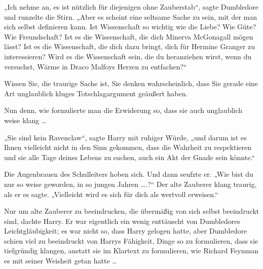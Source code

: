„Ich nehme an, es ist nützlich für diejenigen ohne Zauberstab“, sagte Dumbledore und runzelte die Stirn.
„Aber es scheint eine seltsame Sache zu sein, mit der man sich selbst definieren kann. Ist Wissenschaft so wichtig wie die Liebe? Wie Güte? Wie Freundschaft? Ist es die Wissenschaft, die dich Minerva McGonagall mögen lässt? Ist es die Wissenschaft, die dich dazu bringt, dich für Hermine Granger zu interessieren? Wird es die Wissenschaft sein, die du heranziehen wirst, wenn du versuchst, Wärme in Draco Malfoys Herzen zu entfachen?“

Wissen Sie, die traurige Sache ist, Sie denken wahrscheinlich, dass Sie gerade eine Art unglaublich kluges Totschlagargument geäußert haben.

Nun denn, wie formulierte man die Erwiderung so, dass sie auch unglaublich weise klang …

„Sie sind kein Ravenclaw“, sagte Harry mit ruhiger Würde, „und darum ist es Ihnen vielleicht nicht in den Sinn gekommen, dass die Wahrheit zu respektieren und sie alle Tage deines Lebens zu suchen, auch ein Akt der Gnade sein könnte.“

Die Augenbrauen des Schulleiters hoben sich. Und dann seufzte er.
„Wie bist du nur so weise geworden, in so jungen Jahren ….?“ Der alte Zauberer klang traurig, als er es sagte.
„Vielleicht wird es sich für dich als wertvoll erweisen.“

Nur um alte Zauberer zu beeindrucken, die übermäßig von sich selbst beeindruckt sind, dachte Harry. Er war eigentlich ein wenig enttäuscht von Dumbledores Leichtgläubigkeit; es war nicht so, dass Harry gelogen hatte, aber Dumbledore schien viel zu beeindruckt von Harrys Fähigkeit, Dinge so zu formulieren, dass sie tiefgründig klangen, anstatt sie im Klartext zu formulieren, wie Richard Feynman es mit seiner Weisheit getan hatte …

